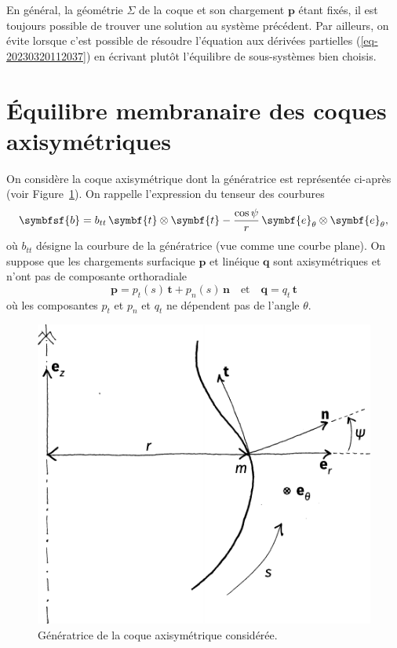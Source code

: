\documentclass[
  a4paper,
  DIV=11,
  numbers=noendperiod]{scrreprt}
\newcommand{\tens}[1]{\symbfsf{#1}}
\renewcommand{\vec}[1]{\symbf{#1}}
\begin{document}
En général, la géométrie \(\Sigma\) de la coque et son chargement
\(\vec{p}\) étant fixés, il est toujours possible de trouver une
solution au système précédent. Par ailleurs, on évite lorsque c'est
possible de résoudre l'équation aux dérivées partielles
(\ref{eq-20230320112037}) en écrivant plutôt l'équilibre de
sous-systèmes bien choisis.

\hypertarget{uxe9quilibre-membranaire-des-coques-axisymuxe9triques}{%
\section{Équilibre membranaire des coques
axisymétriques}\label{uxe9quilibre-membranaire-des-coques-axisymuxe9triques}}

On considère la coque axisymétrique dont la génératrice est représentée
ci-après (voir Figure~\ref{fig-20230320112648}). On rappelle
l'expression du tenseur des courbures \[
\tens{b} = b_{tt} \, \vec{t} \otimes \vec{t} - \frac{\cos \psi}{r} \, \vec{e}_\theta \otimes \vec{e}_\theta,
\] où \(b_{tt}\) désigne la courbure de la génératrice (vue comme une
courbe plane). On suppose que les chargements surfacique \(\vec{p}\) et
linéique \(\vec{q}\) sont axisymétriques et n'ont pas de composante
orthoradiale \[
\vec{p} = p_t(s) \, \vec{t} + p_n(s) \, \vec{n} \quad \text{et} \quad
\vec{q} = q_t \, \vec{t}
\] où les composantes \(p_t\) et \(p_n\) et \(q_t\) ne dépendent pas de
l'angle \(\theta\).

\begin{figure}

{\centering \includegraphics{croquis/fig20230307165827.pdf}

}

\caption{\label{fig-20230320112648}Génératrice de la coque axisymétrique
considérée.}

\end{figure}
\end{document}
